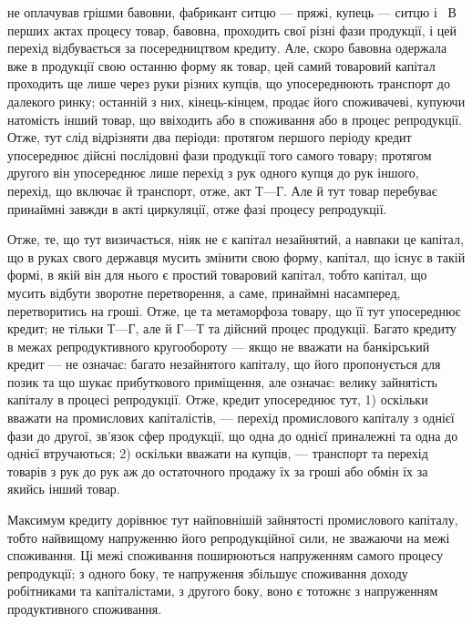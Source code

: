 \parcont{}  %
не оплачував грішми бавовни, фабрикант ситцю — пряжі, купець — ситцю і~
В перших актах процесу товар, бавовна, проходить свої різні фази продукції, і цей
перехід відбувається за посередництвом кредиту. Але, скоро бавовна одержала
вже в продукції свою останню форму як товар, цей самий товаровий капітал
проходить ще лише через руки різних купців, що упосереднюють транспорт до
далекого ринку; останній з них, кінець-кінцем, продає його споживачеві,
купуючи натомість інший товар, що ввіходить або в споживання або в процес
репродукції. Отже, тут слід відрізняти два періоди: протягом першого періоду
кредит упосереднює дійсні послідовні фази продукції того самого товару; протягом
другого він упосереднює лише перехід з рук одного купця до рук іншого, перехід,
що включає й транспорт, отже, акт $Т — Г$. Але й тут товар перебуває принаймні
завжди в акті циркуляції, отже фазі процесу репродукції.

Отже, те, що тут визичається, ніяк не є капітал незайнятий, а навпаки це
капітал, що в руках свого державця мусить змінити свою форму, капітал, що
існує в такій формі, в якій він для нього є простий товаровий капітал, тобто
капітал, що мусить відбути зворотне перетворення, а саме, принаймні насамперед,
перетворитись на гроші. Отже, це та метаморфоза товару, що її тут упосереднює
кредит; не тільки $Т — Г$, але й $Г — Т$ та дійсний процес продукції.
Багато кредиту в межах репродуктивного кругообороту — якщо не вважати на банкірський
кредит — не означає: багато незайнятого капіталу, що його пропонується
для позик та що шукає прибуткового приміщення, але означає: велику
зайнятість капіталу в процесі репродукції. Отже, кредит упосереднює тут,
1) оскільки вважати на промислових капіталістів, — перехід промислового капіталу
з однієї фази до другої, зв’язок сфер продукції, що одна до однієї приналежні
та одна до однієї втручаються; 2) оскільки вважати на купців, —
транспорт та перехід товарів з рук до рук аж до остаточного продажу їх за
гроші або обмін їх за якийсь інший товар.

Максимум кредиту дорівнює тут найповнішій зайнятості промислового капіталу,
тобто найвищому напруженню його репродукційної сили, не зважаючи на межі
споживання. Ці межі споживання поширюються напруженням самого процесу
репродукції; з одного боку, те напруження збільшує споживання доходу робітниками
та капіталістами, з другого боку, воно є тотожнє з напруженням продуктивного
споживання.


